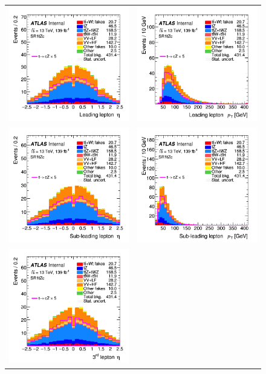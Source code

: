 \begin{figure}[!htbp]
	\centering
	\begin{tabular}{cc}
		\includegraphics[width=.35\textwidth]{Appendices/AP5/figures/SR1/lep1_eta} &
		\includegraphics[width=.35\textwidth]{Appendices/AP5/figures/SR1/lep1_pt} \\
		\includegraphics[width=.35\textwidth]{Appendices/AP5/figures/SR1/lep2_eta} &
		\includegraphics[width=.35\textwidth]{Appendices/AP5/figures/SR1/lep2_pt} \\
		\includegraphics[width=.35\textwidth]{Appendices/AP5/figures/SR1/lep3_eta} &

\end{tabular}
\end{figure}
